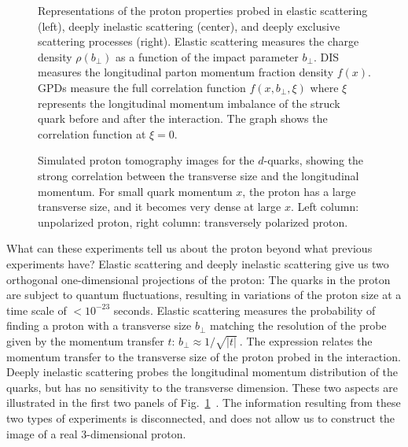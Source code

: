 \begin{figure}[ht]
\vspace{8.5cm} 
\caption{\small{Representations of the proton properties probed in elastic 
scattering (left), deeply inelastic scattering (center), and deeply 
exclusive scattering processes (right). Elastic scattering measures the 
charge density $\rho (b_{\perp})$ as a function of the impact parameter 
$b_{\perp}$.  DIS measures the longitudinal parton momentum fraction density 
$f(x)$. GPDs measure the full correlation function $f(x,b_{\perp},\xi)$ where 
$\xi$ represents the longitudinal momentum imbalance of the struck quark 
before and after the interaction. The graph shows the correlation function 
at $\xi=0$.}}
\label{fig:figure1}
\end{figure}

\begin{figure}[ht]
\vspace{11.0cm} 
\caption{\small{Simulated proton tomography images for the $d$-quarks, 
showing the strong correlation between the transverse size and the 
longitudinal momentum\cite{burkardt}.  For small quark momentum $x$, the 
proton has a large transverse size, and it becomes very dense at large $x$. 
Left column: unpolarized proton, right column: transversely polarized proton.}}
\label{fig:figure2}
\end{figure}

What can these experiments tell us about the proton beyond what previous  
experiments have?  Elastic scattering and deeply inelastic scattering give 
us two orthogonal one-dimensional projections of the proton: The quarks in 
the proton are subject to quantum fluctuations, resulting in variations of 
the proton size at a time scale of $< 10^{-23}$ seconds.  Elastic scattering 
measures the probability of finding a proton with a transverse size 
$b_\perp$ matching the resolution of the probe given by the momentum 
transfer $t$: $b_{\perp} \approx {1/\sqrt{|t|}}~$. The expression relates 
the momentum transfer to the transverse size of the proton probed in the 
interaction. Deeply inelastic scattering probes the longitudinal momentum 
distribution of the quarks, but has no sensitivity to the transverse 
dimension.  These two aspects are illustrated in the first two panels of 
Fig.~\ref{fig:figure1}~\cite{belitsky}.  The information resulting from 
these two types of experiments is disconnected, and does not allow us to 
construct the image of a real 3-dimensional proton.   

